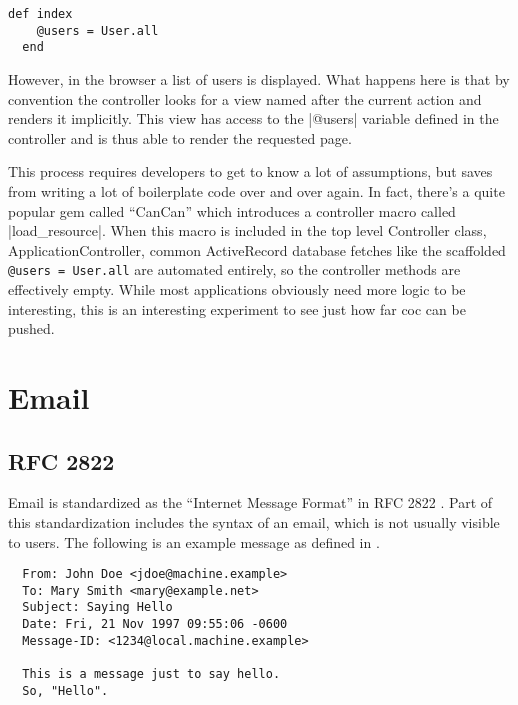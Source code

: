 \begin{lstlisting}[escapechar=!]
  def index
    @users = User.all
  end
\end{lstlisting}

However, in the browser a list of users is displayed. What happens here is that by convention the controller looks for a view named after the current action and renders it implicitly. This view has access to the |@users| variable defined in the controller and is thus able to render the requested page.

This process requires developers to get to know a lot of assumptions, but saves from writing a lot of boilerplate code over and over again. In fact, there's a quite popular \gls{gem} called ``CanCan'' which introduces a controller macro called |load\_resource|. When this macro is included in the top level Controller class, ApplicationController, common ActiveRecord database fetches like the scaffolded \lstinline{@users = User.all} are automated entirely, so the controller methods are effectively empty. While most applications obviously need more logic to be interesting, this is an interesting experiment to see just how far \gls{coc} can be pushed.


\section{Email}

\subsection{RFC 2822}

Email is standardized as the ``Internet Message Format'' in RFC 2822 \citep{email}. Part of this standardization includes the syntax of an email, which is not usually visible to users. The following is an example message as defined in \citep[44]{email}.

\begin{lstlisting}
  From: John Doe <jdoe@machine.example>
  To: Mary Smith <mary@example.net>
  Subject: Saying Hello
  Date: Fri, 21 Nov 1997 09:55:06 -0600
  Message-ID: <1234@local.machine.example>
  
  This is a message just to say hello.
  So, "Hello".
\end{lstlisting}

